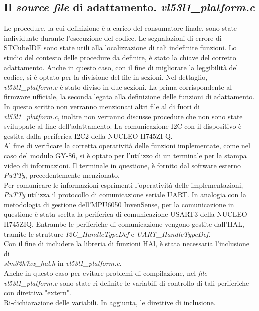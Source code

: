 \documentclass[11pt]{report}
\begin{document}
\subsection{Il \textit{source file} di adattamento. \textit{vl53l1\_platform.c}}
Le procedure, la cui definizione è a carico del consumatore finale, sono state individuate durante l'esecuzione del codice. Le segnalazioni di errore di STCubeIDE sono state utili alla localizzazione di tali indefinite funzioni.
Lo studio del contesto delle procedure da definire, è stato la chiave del corretto adattamento.
Anche in questo caso, con il fine di migliorare la leggibilità del codice, si è optato per la divisione del file in sezioni. Nel dettaglio, \textit{vl53l1\_platform.c} è stato diviso in due sezioni.
La prima corrispondente al firmware ufficiale, la seconda legata alla definizione delle funzioni di adattamento.\\
In questo scritto non verranno menzionati altri file al di fuori di \textit{vl53l1\_platform.c}, inoltre non verranno discusse procedure che non sono state sviluppate al fine dell'adattamento.
La comunicazione I2C con il dispositivo è gestita dalla periferica I2C2 della NUCLEO-H745ZI-Q.\\
Al fine di verificare la corretta operatività delle funzioni implementate, come nel caso del modulo GY-86, si è optato per l'utilizzo di un terminale per la stampa video di informazioni. Il terminale in questione, è fornito dal software esterno \textit{PuTTy}, precedentemente menzionato.\\
Per comunicare le informazioni esprimenti l'operatività delle implementazioni, \textit{PuTTy} utilizza il protocollo di comunicazione seriale UART. In analogia con la metodologia di gestione dell'MPU6050 InvenSense, per la comunicazione in questione è stata scelta la periferica di comunicazione USART3 della NUCLEO-H745ZIQ.
Entrambe le periferiche di comunicazione vengono gestite dall'HAL, tramite le strutture \textit{I2C\_HandleTypeDef} e \textit{UART\_HandleTypeDef}.\\
Con il fine di includere la libreria di funzioni HAl, è stata necessaria l'inclusione di\\\textit{stm32h7xx\_hal.h} in \textit{vl53l1\_platform.c}.\\
Anche in questo caso per evitare problemi di compilazione, nel \textit{file vl53l1\_platform.c} sono state ri-definite le variabili di controllo di tali periferiche con direttiva "extern".\\
Ri-dichiarazione delle variabili. In aggiunta, le direttive di inclusione.
\end{document}
